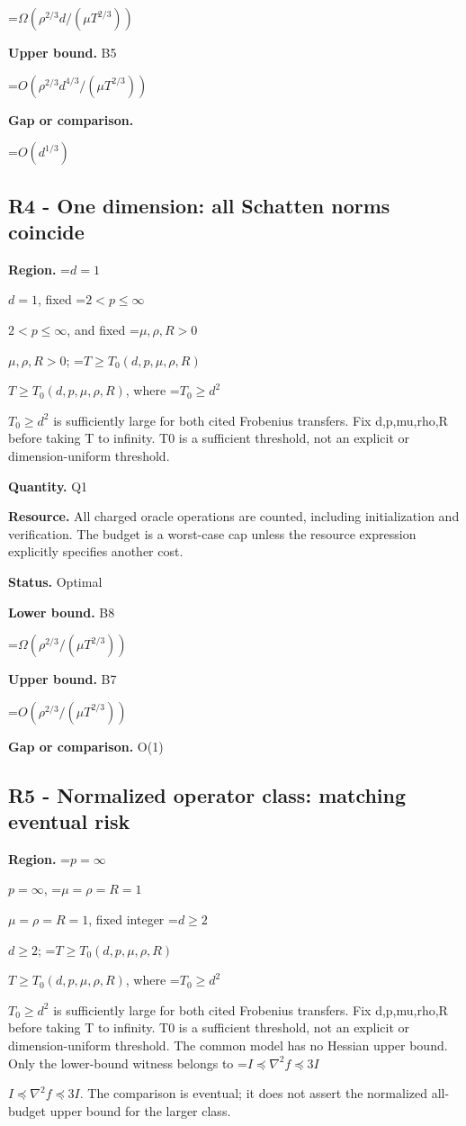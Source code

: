 \documentclass[10pt,a4paper]{article}
\newcommand{\AtlasMath}[1]{\par\begingroup\centering\setbox0=\hbox{$\displaystyle #1$}\ifdim\wd0>1.4\linewidth\typeout{ATLAS WIDE FORMULA: \the\wd0}\fi\ifdim\wd0>\linewidth\resizebox{\linewidth}{!}{\box0}\else\box0\fi\par\endgroup}
\newcommand{\AtlasInlineMath}[1]{\begingroup\setbox0=\hbox{$#1$}\ifdim\wd0>.4\linewidth\endgroup\AtlasMath{#1}\else\endgroup$#1$\fi}
\begin{document}
\AtlasMath{\Omega(\rho^{2/3}d/(\mu T^{2/3}))}


\textbf{Upper bound.} B5



\AtlasMath{O(\rho^{2/3}d^{4/3}/(\mu T^{2/3}))}


\textbf{Gap or comparison.}



\AtlasMath{O(d^{1/3})}


\subsection{R4 - One dimension: all Schatten norms coincide}


\textbf{Region.} \AtlasInlineMath{d=1}, fixed \AtlasInlineMath{2<p\le\infty}, and fixed \AtlasInlineMath{\mu,\rho,R>0}; \AtlasInlineMath{T\ge T_0(d,p,\mu,\rho,R)}, where \AtlasInlineMath{T_0\ge d^2} is sufficiently large for both cited Frobenius transfers. Fix d,p,mu,rho,R before taking T to infinity. T0 is a sufficient threshold, not an explicit or dimension-uniform threshold.



\textbf{Quantity.} Q1



\textbf{Resource.} All charged oracle operations are counted, including initialization and verification. The budget is a worst-case cap unless the resource expression explicitly specifies another cost.



\textbf{Status.} Optimal



\textbf{Lower bound.} B8



\AtlasMath{\Omega(\rho^{2/3}/(\mu T^{2/3}))}


\textbf{Upper bound.} B7



\AtlasMath{O(\rho^{2/3}/(\mu T^{2/3}))}


\textbf{Gap or comparison.} O(1)



\subsection{R5 - Normalized operator class: matching eventual risk}


\textbf{Region.} \AtlasInlineMath{p=\infty}, \AtlasInlineMath{\mu=\rho=R=1}, fixed integer \AtlasInlineMath{d\ge2}; \AtlasInlineMath{T\ge T_0(d,p,\mu,\rho,R)}, where \AtlasInlineMath{T_0\ge d^2} is sufficiently large for both cited Frobenius transfers. Fix d,p,mu,rho,R before taking T to infinity. T0 is a sufficient threshold, not an explicit or dimension-uniform threshold. The common model has no Hessian upper bound. Only the lower-bound witness belongs to \AtlasInlineMath{I\preceq\nabla^2 f\preceq3I}. The comparison is eventual; it does not assert the normalized all-budget upper bound for the larger class.
\end{document}
